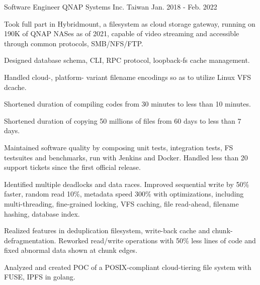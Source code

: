 \begin{cventries}
  \cventry
    {Software Engineer} %
    {QNAP Systems Inc.} %
    {Taiwan} %
    {Jan. 2018 - Feb. 2022} %
    {
      \begin{cvitems} %
        \item {Took full part in Hybridmount, a filesystem as cloud storage
          gateway, running on 190K of QNAP NASes as of 2021, capable of video
          streaming and accessible through common protocols, SMB/NFS/FTP.}
        \item {Designed database schema, CLI, RPC protocol, loopback-fs cache
          management.}
        \item {Handled cloud-, platform- variant filename encodings so as to
          utilize Linux VFS dcache.}
        \item {Shortened duration of compiling codes from 30 minutes to less
          than 10 minutes.}
        \item {Shortened duration of copying 50 millions of files from 60 days
          to less than 7 days.}
        \item {Maintained software quality by composing unit tests, integration
          tests, FS testsuites and benchmarks, run with Jenkins and Docker.
          Handled less than 20 support tickets since the first official release.}
        \item {Identified multiple deadlocks and data races. Improved sequential
          write by 50\% faster, random read 10\%, metadata speed 300\% with
          optimizations, including multi-threading, fine-grained locking, VFS
          caching, file read-ahead, filename hashing, database index.}
        \item {Realized features in deduplication filesystem, write-back cache
          and chunk-defragmentation. Reworked read/write operations with 50\%
          less lines of code and fixed abnormal data shown at chunk edges.}
        \item {Analyzed and created POC of a POSIX-compliant cloud-tiering file
          system with FUSE, IPFS in golang.}
      \end{cvitems}
    }

\end{cventries}
